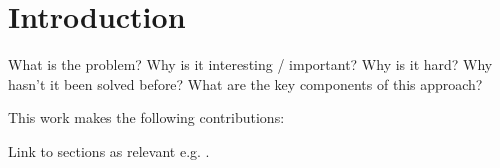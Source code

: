 \section{Introduction}
\label{sec:intro}
What is the problem?
Why is it interesting / important?
Why is it hard?
Why hasn't it been solved before?
What are the key components of this approach?

This work makes the following contributions:
\begin{tightitemize}
  \item Link to
  sections as relevant e.g. .
\end{tightitemize}